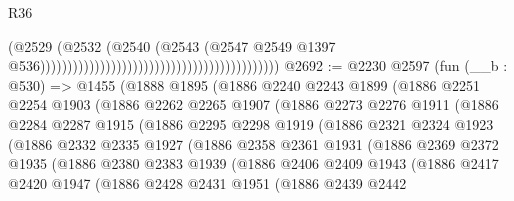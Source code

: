 \begin{lexlean}{R36}
\begin{coremodule}
                                                                                  (@2529
                                                                                    (@2532
                                                                                      (@2540
                                                                                        (@2543
                                                                                          (@2547
                                                                                            @2549
                                                                                            @1397
                                                                                            @536))))))))))))))))))))))))))))))))))))))))))))
@2692 := @2230
    @2597
    (fun (__b : @530) =>
    @1455
      (@1888
        @1895
        (@1886
          @2240
          @2243
          @1899
          (@1886
            @2251
            @2254
            @1903
            (@1886
              @2262
              @2265
              @1907
              (@1886
                @2273
                @2276
                @1911
                (@1886
                  @2284
                  @2287
                  @1915
                  (@1886
                    @2295
                    @2298
                    @1919
                    (@1886
                      @2321
                      @2324
                      @1923
                      (@1886
                        @2332
                        @2335
                        @1927
                        (@1886
                          @2358
                          @2361
                          @1931
                          (@1886
                            @2369
                            @2372
                            @1935
                            (@1886
                              @2380
                              @2383
                              @1939
                              (@1886
                                @2406
                                @2409
                                @1943
                                (@1886
                                  @2417
                                  @2420
                                  @1947
                                  (@1886
                                    @2428
                                    @2431
                                    @1951
                                    (@1886
                                      @2439
                                      @2442

\end{coremodule}
\end{lexlean}
